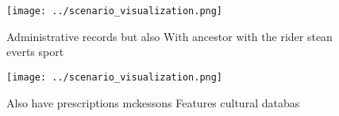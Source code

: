\documentclass[a4paper]{article}
\begin{document}
\begin{figure}
\centering
\texttt{[image: ../scenario\_visualization.png]}
\caption{Administrative records but also With ancestor with the rider stean everts sport
}
\end{figure}
 
\begin{figure}
\centering
\texttt{[image: ../scenario\_visualization.png]}
\caption{Also have prescriptions mckessons Features cultural databas
}
\end{figure}
 
\end{document}
